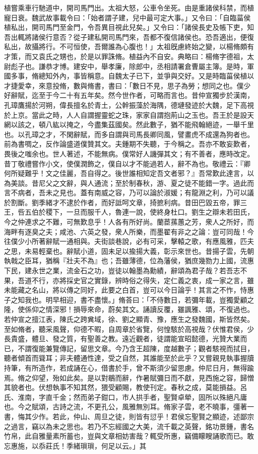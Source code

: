 \begin{pinyinscope}
植嘗乘車行馳道中，開司馬門出。太祖大怒，公車令坐死。由是重諸侯科禁，而植寵日衰。魏武故事載令曰：「始者謂子建，兒中最可定大事。」又令曰：「自臨菑侯植私出，開司馬門至金門，令吾異目視此兒矣。」又令曰：「諸侯長史及帳下吏，知吾出輒將諸侯行意否？從子建私開司馬門來，吾都不復信諸侯也。恐吾適出，便復私出，故攝將行。不可恒使，吾爾誰為心腹也！」太祖旣慮終始之變，以楊脩頗有才策，而又袁氏之甥也，於是以罪誅脩。植益內不自安。典略曰：楊脩字德祖，太尉彪子也。謙恭才博。建安中，舉孝廉，除郎中，丞相請署倉曹屬主簿。是時，軍國多事，脩總知外內，事皆稱意。自魏太子已下，並爭與交好。又是時臨菑侯植以才捷愛幸，來意投脩，數與脩書，書曰：「數日不見，思子為勞；想同之也。僕少好辭賦，迄至于今二十有五年矣。然今世作者，可略而言也。昔仲宣獨步於漢南，孔璋鷹揚於河朔，偉長擅名於青土，公幹振藻於海隅，德璉發迹於大魏，足下高視於上京。當此之時，人人自謂握靈蛇之珠，家家自謂抱荊山之玉也。吾王於是設天網以該之，頓八紘以掩之，今盡集茲國矣。然此數子，猶不能飛翰絕迹，一舉千里也。以孔璋之才，不閑辭賦，而多自謂與司馬長卿同風，譬畫虎不成還為狗者也。前為書啁之，反作論盛道僕贊其文。夫鍾期不失聽，于今稱之。吾亦不敢妄歎者，畏後之嗤余也。世人著述，不能無病。僕常好人譏彈其文；有不善者，應時改定。昔丁敬禮嘗作小文，使僕潤飾之，僕自以才不能過若人，辭不為也。敬禮云：『卿何所疑難乎！文之佳麗，吾自得之。後世誰相知定吾文者邪？』吾常歎此達言，以為美談。昔尼父之文辭，與人通流；至於制春秋，游、夏之徒不能錯一字。過此而言不病者，吾未之見也。蓋有南威之容，乃可以論於淑媛；有龍淵之利，乃可以議於割斷。劉季緒才不逮於作者，而好詆呵文章，掎摭利病。昔田巴毀五帝，罪三王，呰五伯於稷下，一旦而服千人，魯連一說，使終身杜口。劉生之辯未若田氏，今之仲連求之不難，可無歎息乎！人各有所好尚。蘭茞蓀蕙之芳，衆人之所好，而海畔有逐臭之夫；咸池、六英之發，衆人所樂，而墨翟有非之之論：豈可同哉！今往僕少小所著辭賦一通相與。夫街談巷說，必有可采，擊轅之歌，有應風雅，匹夫之思，未易輕棄也。辭賦小道，固未足以揄揚大義，彰示來世也。昔揚子雲，先朝執戟之臣耳，猶稱『壯夫不為』也；吾雖薄德，位為藩侯，猶庶幾勠力上國，流惠下民，建永世之業，流金石之功，豈徒以翰墨為勳績，辭頌為君子哉？若吾志不果，吾道不行，亦將採史官之實錄，辨時俗之得失，定仁義之衷，成一家之言，雖未能藏之名山，將以傳之同好，此要之白首，豈可以今日論乎！其言之不怍，恃惠子之知我也。明早相迎，書不盡懷。」脩荅曰：「不侍數日，若彌年載，豈獨愛顧之隆，使係仰之情深邪！損辱來命，蔚矣其文。誦讀反覆，雖諷雅、頌，不復過也。若仲宣之擅江表，陳氏之跨兾域，徐、劉之顯青、豫，應生之發魏國，斯皆然矣。至如脩者，聽采風聲，仰德不暇，自周章於省覽，何惶駭於高視哉？伏惟君侯，少長貴盛，體旦、發之質，有聖善之教。遠近觀者，徒謂能宣昭懿德，光贊大業而已，不謂復能兼覽傳記，留思文章。今乃含王超陳，度越數子；觀者駭視而拭目，聽者傾首而聳耳；非夫體通性達，受之自然，其誰能至於此乎？又嘗親見執事握牘持筆，有所造作，若成誦在心，借書於手，曾不斯須少留思慮。仲尼日月，無得踰焉。脩之仰望，殆如此矣。是以對鶡而辭，作暑賦彌日而不獻，見西施之容，歸憎其貌者也。伏想執事不知其然，猥受顧賜，教使刊定。春秋之成，莫能損益。呂氏、淮南，字直千金；然而弟子鉗口，市人拱手者，聖賢卓犖，固所以殊絕凡庸也。今之賦頌，古詩之流，不更孔公，風雅無別耳。脩家子雲，老不曉事，彊著一書，悔其少作。若此，仲山、周旦之徒，則皆有愆乎！君侯忘聖賢之顯迹，述鄙宗之過言，竊以為未之思也。若乃不忘經國之大美，流千載之英聲，銘功景鍾，書名竹帛，此自雅量素所蓄也，豈與文章相妨害哉？輒受所惠，竊備矇瞍誦歌而已。敢忘惠施，以忝莊氏！季緒瑣瑣，何足以云。」其
\end{pinyinscope}
